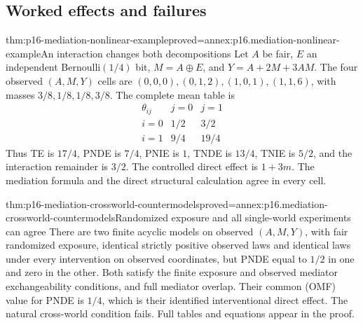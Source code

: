 \subsection{Worked effects and failures}

\begin{hbtheorem}{thm:p16-mediation-nonlinear-example}{proved=annex:p16.mediation-nonlinear-example}{An interaction changes both decompositions}
Let \(A\) be fair, \(E\) an independent Bernoulli\((1/4)\) bit,
\(M=A\oplus E\), and \(Y=A+2M+3AM\). The four observed
\((A,M,Y)\) cells are \((0,0,0),(0,1,2),(1,0,1),(1,1,6)\),
with masses \(3/8,1/8,1/8,3/8\). The complete mean table is
\[
 \begin{array}{c|cc}
 \theta_{ij}&j=0&j=1\\\hline
 i=0&1/2&3/2\\i=1&9/4&19/4
 \end{array}
\]
Thus TE is \(17/4\), PNDE is \(7/4\), PNIE is \(1\), TNDE is
\(13/4\), TNIE is \(5/2\), and the interaction remainder is \(3/2\).
The controlled direct effect is \(1+3m\). The mediation formula and
the direct structural calculation agree in every cell.
\end{hbtheorem}

\begin{hbtheorem}{thm:p16-mediation-crossworld-countermodels}{proved=annex:p16.mediation-crossworld-countermodels}{Randomized exposure and all single-world experiments can agree}
There are two finite acyclic models on observed \((A,M,Y)\), with fair
randomized exposure, identical strictly positive observed laws and identical
laws under every intervention on observed coordinates, but PNDE equal
to \(1/2\) in one and zero in the other. Both satisfy the finite
exposure and observed mediator exchangeability conditions, and full
mediator overlap. Their common (OMF) value for PNDE is \(1/4\),
which is their identified interventional direct effect. The natural
cross-world condition fails. Full tables and equations appear in the proof.
\end{hbtheorem}

